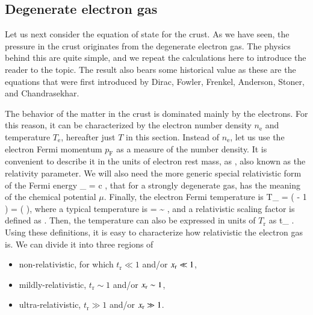 \subsection{Degenerate electron gas}
Let us next consider the equation of state for the crust.
As we have seen, the pressure in the crust originates from the degenerate electron gas.
The physics behind this are quite simple, and we repeat the calculations here to introduce the reader to the topic.
The result also bears some historical value as these are the equations that were first introduced by Dirac\cite{Dirac25}, Fowler\cite{Fowler26}, Frenkel\cite{Frenkel28}, Anderson\cite{Anderson29}, Stoner\cite{Stoner30}, and Chandrasekhar\cite{Cha31}.\cite[see also][]{Cha39, Schatzman58, Salpeter61, Tooper69, ZN71, LL80, Blinnikov87, YS89, HPY07}

The behavior of the matter in the crust is dominated mainly by the electrons. 
For this reason, it can be characterized by the electron number density $n_{\mathrm{e}}$ and temperature $T_{\mathrm{e}}$, hereafter just $T$ in this section.
Instead of $n_{\mathrm{e}}$, let us use the electron Fermi momentum $p_{\mathrm{F}}$  as a measure of the number density.
It is convenient to describe it in the units of electron rest mass, as
\be
\xr \equiv {},
\ee
also known as the relativity parameter.\cite{Salpeter61}
We will also need the more generic special relativistic form of the Fermi energy
\be
\epsilon_{} = c ,
\ee
that for a strongly degenerate gas, has the meaning of the chemical potential $\mu$.
Finally, the electron Fermi temperature is
\be
T_{} =  \left(  - 1 \right)
= \Tr (  ),
\ee
where a typical temperature is
\be
\Tr =  \sim {} \Kelvin,
\ee
and a relativistic scaling factor is defined as
\be
\gammar \equiv {}.
\ee
Then, the temperature can also be expressed in units of $T_{\mathrm{r}}$ as 
\be
t_{} \equiv {}.
\ee
Using these definitions, it is easy to characterize how relativistic the electron gas is.
We can divide it into three regions of 
\begin{itemize}
    \item non-relativistic, for which $t_{\mathrm{r}} \ll 1 $ and/or $x_{\mathrm{r}} \ll 1$, 
    \item mildly-relativistic, $t_{\mathrm{r}} \sim 1$ and/or $x_{\mathrm{r}} \sim 1$,
    \item ultra-relativistic, $t_{\mathrm{r}} \gg 1$ and/or $x_{\mathrm{r}} \gg 1$.
\end{itemize}

